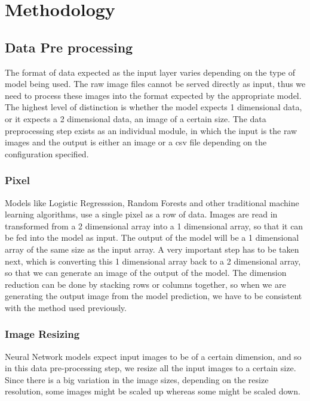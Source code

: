 \section{Methodology}

\subsection{Data Pre processing}

The format of data expected as the input layer varies depending on the type of model being used. The raw image files cannot be served directly
as input, thus we need to process these images into the format expected by the appropriate model. The highest level of distinction is 
whether the model expects 1 dimensional data, or it expects a 2 dimensional data, an image of a certain size.
The data preprocessing step exists as an individual module, in which the input is the raw images and the output is either an image or a 
csv file depending on the configuration specified. 

\subsubsection{Pixel}

Models like Logistic Regresssion, Random Forests and other traditional machine learning algorithms, use a single pixel as a row of data.
Images are read in transformed from a 2 dimensional array into a 1 dimensional array, so that it can be fed into the model as input.
The output of the model will be a 1 dimensional array of the same size as the input array. A very important step has to be taken next,
which is converting this 1 dimensional array back to a 2 dimensional array, so that we can generate an image of the output of the model.
The dimension reduction can be done by stacking rows or columns together, so when we are generating the output image from the model 
prediction, we have to be consistent with the method used previously.

\subsubsection{Image Resizing}

Neural Network models expect input images to be of a certain dimension, and so in this data pre-processing step, we resize all the input images to
a certain size. Since there is a big variation in the image sizes, depending on the resize resolution, some images might be scaled up whereas 
some might be scaled down.



